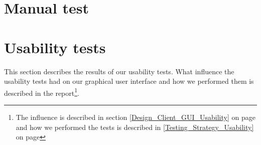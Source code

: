 \section{Manual test}
\label{Appendix_Test_Manual}

\section{Usability tests}
\label{Appendix_Test_Usability}
This section describes the results of our usability tests. What influence the usability tests had on our graphical user interface and how we performed them is described in the report\footnote{The influence is described in section \ref {Design_Client_GUI_Usability} on page \pageref{Design_Client_GUI_Usability} and how we performed the tests is described in \ref{Testing_Strategy_Usability} on page \pageref{Testing_Strategy_Usability}}.